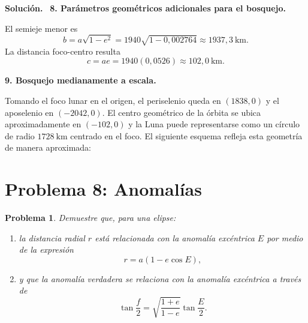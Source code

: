 \documentclass[11pt]{article}
\theoremstyle{prismstyle}
\newtheorem{problem}{Problema}
\newenvironment{solution}[1][Solución]
  {\par\textbf{#1.}\ }
  {\par}
\newcommand{\problemsection}[2]{
  \section{#1}
  \begin{problem}
  #2
  \end{problem}
}
\begin{document}
\begin{solution}
\textbf{8. Parámetros geométricos adicionales para el bosquejo.}

El semieje menor es
\[
b = a\sqrt{1-e^2} = 1940\sqrt{1-0{,}002764} \approx 1937{,}3\ \text{km}.
\]
La distancia foco-centro resulta
\[
c = ae = 1940(0{,}0526) \approx 102{,}0\ \text{km}.
\]

\textbf{9. Bosquejo medianamente a escala.}

Tomando el foco lunar en el origen, el periselenio queda en $(1838,0)$ y el aposelenio en $(-2042,0)$. El centro geométrico de la órbita se ubica aproximadamente en $(-102,0)$ y la Luna puede representarse como un círculo de radio $1728\ \text{km}$ centrado en el foco. El siguiente esquema refleja esta geometría de manera aproximada:

\begin{center}
\shorthandoff{<>}
\shorthandon{<>}
\end{center}
\end{solution}

\problemsection{Problema 8: Anomalías}{
Demuestre que, para una elipse:
\begin{enumerate}[label=\alph*)]
  \item la distancia radial $r$ está relacionada con la anomalía excéntrica $E$ por medio de la expresión
  \[
  r = a(1 - e\cos E),
  \]
  \item y que la anomalía verdadera se relaciona con la anomalía excéntrica a través de
  \[
  \tan\frac{f}{2} = \sqrt{\frac{1+e}{1-e}}\tan\frac{E}{2}.
  \]
\end{enumerate}
}
\end{document}
